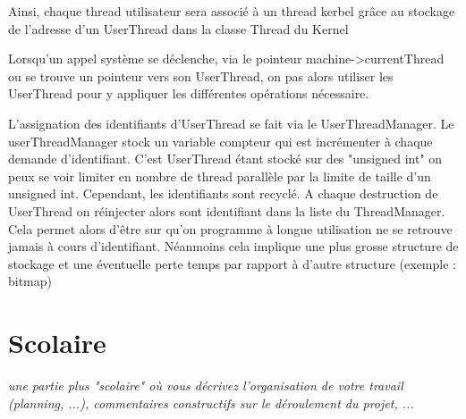 \documentclass{article}
\begin{document}
Ainsi, chaque thread utilisateur sera associé à un thread kerbel grâce au stockage de l'adresse d'un UserThread dans la classe Thread du Kernel


Lorsqu'un appel système se déclenche, via le pointeur machine->currentThread ou se trouve un pointeur vers son UserThread, on pas alors utiliser les UserThread pour y appliquer les différentes opérations nécessaire.
\vspace{5mm}

L'assignation des identifiants d'UserThread se fait via le UserThreadManager. Le userThreadManager stock un variable compteur qui est incrémenter à chaque demande d'identifiant. C'est UserThread étant stocké sur des "unsigned int" on peux se voir limiter en nombre de thread parallèle par la limite de taille d'un unsigned int. Cependant, les identifiants sont recyclé. A chaque destruction de UserThread on réinjecter alors sont identifiant dans la liste du ThreadManager. Cela permet alors d'être sur qu'on programme à longue utilisation ne se retrouve jamais à cours d'identifiant. Néanmoins cela implique une plus grosse structure de stockage et une éventuelle perte temps par rapport à d'autre structure (exemple : bitmap)

\section{Scolaire}
\textit{une partie plus "scolaire" où vous décrivez l'organisation de votre travail (planning, ...), commentaires constructifs sur le déroulement du projet, ...}
\vspace{5mm}
\end{document}
